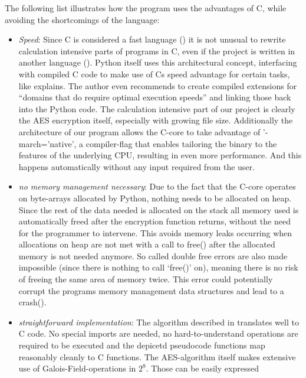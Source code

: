 The following list illustrates how the program uses the advantages of C,
while avoiding the shortcomings of the language:

\begin{itemize}

\item
  \emph{Speed}: Since C is considered a fast language (\cite[p. 4]{cmodern}) it is
  not unusual to rewrite calculation intensive parts of programs in C,
  even if the project is written in another language
  (\cite[min. 24:33]{speedup}). Python itself
  uses this architectural concept, interfacing with compiled C code to
  make use of Cs speed advantage for certain tasks, like \cite[p. 7]{learningpython} explains. The author even recommends to create compiled extensions
  for ``domains that do require optimal execution speeds'' and linking
  those back into the Python code. The calculation intensive part of our
  project is clearly the AES encryption itself, especially with growing
  file size. Additionally the architecture of our program allows the C-core to take advantage of '-march='native',
  a compiler-flag that enables tailoring the binary to the features of the underlying CPU,
  resulting in even more performance. And this happens automatically without any input required from the user.
\item
  \emph{no memory management necessary}: Due to the fact that the C-core
  operates on byte-arrays allocated by Python, nothing needs to be
  allocated on heap. Since the rest of the data needed is allocated on
  the stack all memory used is automatically freed after the encryption
  function returns, without the need for the programmer to intervene.
  This avoids memory leaks occurring when allocations on heap are not
  met with a call to free() after the allocated memory is not needed
  anymore. So called double free errors are also made impossible (since
  there is nothing to call `free()' on), meaning there is no risk of
  freeing the same area of memory twice. This error could potentially
  corrupt the programs memory management data structures and lead to a
  crash(\cite[p. 49]{cpointers}).
\item
  \emph{straightforward implementation}: The algorithm described in
  \cite{fips197} translates well to C code. No special imports are needed, no
  hard-to-understand operations are required to be executed and the
  depicetd pseudocode functions map reasonably cleanly to C functions.
  The AES-algorithm itself makes extensive use of
  Galois-Field-operations in $2^8$. Those can be easily expressed

\end{itemize}
